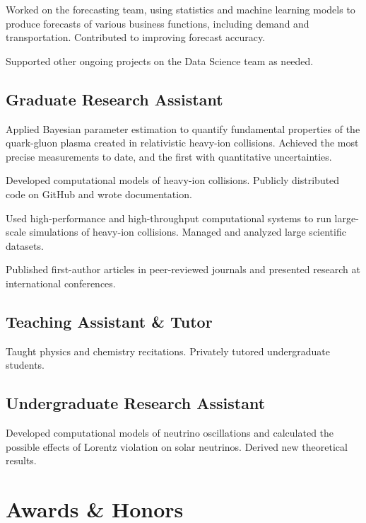 \documentclass[letterpaper,10pt]{article}
\begin{document}
\begin{multicols}{2}
Worked on the forecasting team, using statistics and machine learning models to produce forecasts of various business functions, including demand and transportation.
Contributed to improving forecast accuracy.

Supported other ongoing projects on the Data Science team as needed.

\subsection{Graduate Research Assistant}

Applied Bayesian parameter estimation to quantify fundamental properties of the quark-gluon plasma created in relativistic heavy-ion collisions.
Achieved the most precise measurements to date, and the first with quantitative uncertainties.

Developed computational models of heavy-ion collisions.
Publicly distributed code on GitHub and wrote documentation.

Used high-performance and high-throughput computational systems to run large-scale simulations of heavy-ion collisions.
Managed and analyzed large scientific datasets.

Published first-author articles in peer-reviewed journals and presented research at international conferences.

\subsection{Teaching Assistant \& Tutor}

Taught physics and chemistry recitations.
Privately tutored undergraduate students.

\subsection{Undergraduate Research Assistant}

Developed computational models of neutrino oscillations and calculated the possible effects of Lorentz violation on solar neutrinos.
Derived new theoretical results.


\section{Awards \& Honors}


\end{multicols}
\end{document}
